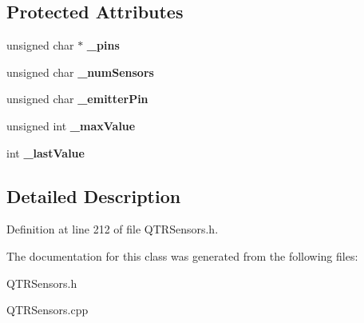 \subsection*{Protected Attributes}
\begin{DoxyCompactItemize}
\item 
\mbox{\label{class_q_t_r_sensors_ad22b7f2b4778133efa1967d683e5cb46}} 
unsigned char $\ast$ {\bfseries \+\_\+pins}
\item 
\mbox{\label{class_q_t_r_sensors_af4e3b5b4b9fd7acb0914a9f345e446f0}} 
unsigned char {\bfseries \+\_\+num\+Sensors}
\item 
\mbox{\label{class_q_t_r_sensors_a116880e22fe5e5c474e021b91e04e2ac}} 
unsigned char {\bfseries \+\_\+emitter\+Pin}
\item 
\mbox{\label{class_q_t_r_sensors_a88657f1405aa7dc840f2025b53e1a4b3}} 
unsigned int {\bfseries \+\_\+max\+Value}
\item 
\mbox{\label{class_q_t_r_sensors_a9c3c8b7ac645020c77ff8198145b46b6}} 
int {\bfseries \+\_\+last\+Value}
\end{DoxyCompactItemize}


\subsection{Detailed Description}


Definition at line 212 of file Q\+T\+R\+Sensors.\+h.



The documentation for this class was generated from the following files\+:\begin{DoxyCompactItemize}
\item 
Q\+T\+R\+Sensors.\+h\item 
Q\+T\+R\+Sensors.\+cpp\end{DoxyCompactItemize}
